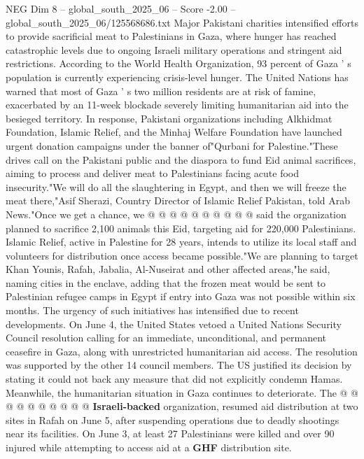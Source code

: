 \begin{textsample}{NEG Dim 8 – global\_south\_2025\_06 – Score -2.00 – global\_south\_2025\_06/125568686.txt}  \label{ex:f8_neg_038}
Major Pakistani charities intensified efforts to provide sacrificial meat to Palestinians in Gaza, where hunger has reached catastrophic levels due to ongoing Israeli military operations and stringent aid restrictions.
According to the World Health Organization, 93 percent of Gaza ' s population is currently experiencing crisis-level hunger.
The United Nations has warned that most of Gaza ' s two million residents are at risk of famine, exacerbated by an 11-week blockade severely limiting humanitarian aid into the besieged territory.
In response, Pakistani organizations including Alkhidmat Foundation, Islamic Relief, and the Minhaj Welfare Foundation have launched urgent donation campaigns under the banner of"Qurbani for Palestine."These drives call on the Pakistani public and the diaspora to fund Eid animal sacrifices, aiming to process and deliver meat to Palestinians facing acute food insecurity."We will do all the slaughtering in Egypt, and then we will freeze the meat there,"Asif Sherazi, Country Director of Islamic Relief Pakistan, told Arab News."Once we get a chance, we @ @ @ @ @ @ @ @ @ @ said the organization planned to sacrifice 2,100 animals this Eid, targeting aid for 220,000 Palestinians.
Islamic Relief, active in Palestine for 28 years, intends to utilize its local staff and volunteers for distribution once access became possible."We are planning to target Khan Younis, Rafah, Jabalia, Al-Nuseirat and other affected areas,"he said, naming cities in the enclave, adding that the frozen meat would be sent to Palestinian refugee camps in Egypt if entry into Gaza was not possible within six months.
The urgency of such initiatives has intensified due to recent developments.
On June 4, the United States vetoed a United Nations Security Council resolution calling for an immediate, unconditional, and permanent ceasefire in Gaza, along with unrestricted humanitarian aid access.
The resolution was supported by the other 14 council members.
The US justified its decision by stating it could not back any measure that did not explicitly condemn Hamas.
Meanwhile, the humanitarian situation in Gaza continues to deteriorate.
The @ @ @ @ @ @ @ @ @ @ \textbf{Israeli-backed} organization, resumed aid distribution at two sites in Rafah on June 5, after suspending operations due to deadly shootings near its facilities.
On June 3, at least 27 Palestinians were killed and over 90 injured while attempting to access aid at a \textbf{GHF} distribution site.

\end{textsample}
